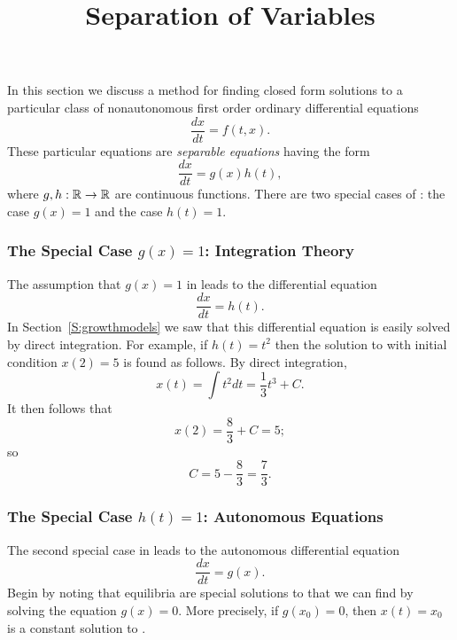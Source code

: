 \documentclass{ximera}
\title{Separation of Variables}
\begin{document}
\begin{abstract}
\end{abstract}
\maketitle


\label{sec:sov} 

In this section we discuss a method for finding closed form solutions to
a particular class of nonautonomous first order ordinary differential 
equations 
\begin{equation}  \label{e:nonauto}
\frac{dx}{dt} = f(t,x).
\end{equation}
These particular equations are {\em separable equations\/} having the form 
\begin{equation}  \label{eq:gh}
\frac{dx}{dt} = g(x) h(t),
\end{equation}
where $g,h:\mbox{$\Bbb{R}$}\to\mbox{$\Bbb{R}$}$ are continuous functions.   There are two special cases 
of : the case $g(x)=1$ and the case $h(t)=1$.  

\subsubsection*{The Special Case $g(x)=1$: Integration Theory}

The assumption that $g(x)=1$ in  leads to the differential 
equation 
\begin{equation}  \label{e:g=1}
\frac{dx}{dt} = h(t).
\end{equation}
In Section~\ref{S:growthmodels} we saw that this differential equation  
is easily solved by direct integration.  For example, if $h(t)=t^2$ then 
the solution to  with initial condition $x(2)=5$ is found as
follows.  By direct integration,
\[
x(t) = \int t^2 dt = \frac{1}{3}t^3 + C.
\]
It then follows that
\[
x(2) = \frac{8}{3} + C = 5;
\]
so 
\[
C = 5 - \frac{8}{3} = \frac{7}{3}.
\]


\subsubsection*{The Special Case $h(t)=1$: Autonomous Equations}

The second special case in  leads to the autonomous 
differential equation
\begin{equation}  \label{e:h=1}
\frac{dx}{dt} = g(x).
\end{equation}
Begin by noting that equilibria are special solutions to  that we 
can find by solving the equation $g(x)=0$.  More precisely, if $g(x_0)=0$, 
then $x(t)=x_0$ is a constant solution to .  
\end{document}
